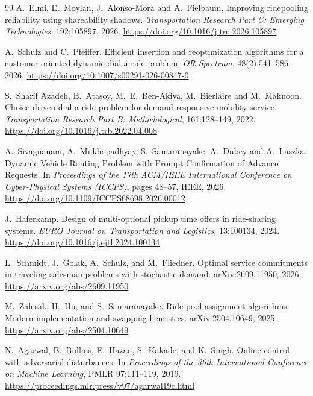 \begin{thebibliography}{99}
A.~Elmi, E.~Moylan, J.~Alonso-Mora and A.~Fielbaum.
\newblock Improving ridepooling reliability using shareability shadows.
\newblock \emph{Transportation Research Part C: Emerging Technologies}, 192:105897, 2026.
\newblock \url{https://doi.org/10.1016/j.trc.2026.105897}

A.~Schulz and C.~Pfeiffer.
\newblock Efficient insertion and reoptimization algorithms for a customer-oriented dynamic dial-a-ride problem.
\newblock \emph{OR Spectrum}, 48(2):541--586, 2026.
\newblock \url{https://doi.org/10.1007/s00291-026-00847-0}

S.~Sharif Azadeh, B.~Atasoy, M.~E.~Ben-Akiva, M.~Bierlaire and M.~Maknoon.
\newblock Choice-driven dial-a-ride problem for demand responsive mobility service.
\newblock \emph{Transportation Research Part B: Methodological}, 161:128--149, 2022.
\newblock \url{https://doi.org/10.1016/j.trb.2022.04.008}

A.~Sivagnanam, A.~Mukhopadhyay, S.~Samaranayake, A.~Dubey and A.~Laszka.
\newblock Dynamic Vehicle Routing Problem with Prompt Confirmation of Advance Requests.
\newblock In \emph{Proceedings of the 17th ACM/IEEE International Conference on Cyber-Physical Systems (ICCPS)}, pages 48--57, IEEE, 2026.
\newblock \url{https://doi.org/10.1109/ICCPS68698.2026.00012}

J.~Haferkamp.
\newblock Design of multi-optional pickup time offers in ride-sharing systems.
\newblock \emph{EURO Journal on Transportation and Logistics}, 13:100134, 2024.
\newblock \url{https://doi.org/10.1016/j.ejtl.2024.100134}

L.~Schmidt, J.~Golak, A.~Schulz, and M.~Fliedner.
\newblock Optimal service commitments in traveling salesman problems with stochastic demand.
\newblock arXiv:2609.11950, 2026.
\newblock \url{https://arxiv.org/abs/2609.11950}

M.~Zalesak, H.~Hu, and S.~Samaranayake.
\newblock Ride-pool assignment algorithms: Modern implementation and swapping heuristics.
\newblock arXiv:2504.10649, 2025.
\newblock \url{https://arxiv.org/abs/2504.10649}

N.~Agarwal, B.~Bullins, E.~Hazan, S.~Kakade, and K.~Singh.
\newblock Online control with adversarial disturbances.
\newblock In \emph{Proceedings of the 36th International Conference on Machine Learning},
PMLR 97:111--119, 2019.
\newblock \url{https://proceedings.mlr.press/v97/agarwal19c.html}


\end{thebibliography}
